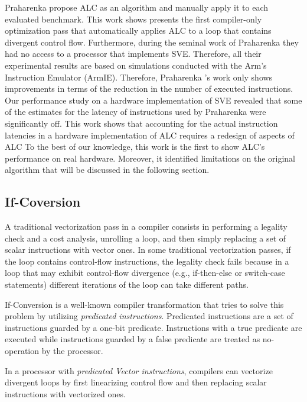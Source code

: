 Praharenka \etal propose ALC as an algorithm and manually apply it to each evaluated benchmark.
This work shows presents the first compiler-only optimization pass that automatically applies ALC to a loop that contains divergent control flow. 
Furthermore, during the seminal work of Praharenka \etal they had no access to a processor that implements SVE.
Therefore, all their experimental results are based on simulations conducted with the Arm's Instruction Emulator (ArmIE).
Therefore, Praharenka \etal's work only shows improvements in terms of the reduction in the number of executed instructions.
Our performance study on a hardware implementation of SVE revealed that some of the estimates for the latency of instructions used by Praharenka \etal were significantly off.
This work shows that accounting for the actual instruction latencies in a hardware implementation of ALC requires a redesign of aspects of ALC
To the best of our knowledge, this work is the first to show ALC's performance on real hardware.
Moreover, it identified limitations on the original algorithm that will be discussed in the following section.

\iffalse
\subsection{If-Coversion}

A traditional vectorization pass in a compiler consists in performing a legality check and a cost analysis, unrolling a loop, and then simply replacing a set of scalar instructions with vector ones.
In some traditional vectorization passes, if the loop contains control-flow instructions, the legality check fails because in a loop that may exhibit control-flow divergence (e.g., if-then-else or switch-case statements) different iterations of the loop can take different paths.

If-Conversion is a well-known compiler transformation that tries to solve this problem by utilizing \emph{predicated instructions}. 
Predicated instructions are a set of instructions guarded by a one-bit predicate. Instructions with a true predicate are executed while instructions guarded by a false predicate are treated as no-operation by the processor.

In a processor with \emph{predicated Vector instructions}, compilers can vectorize divergent loops by first linearizing control flow and then replacing scalar instructions with vectorized ones.

